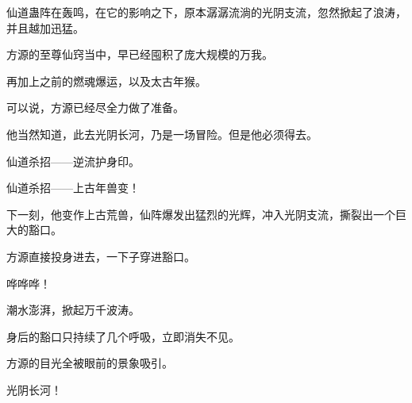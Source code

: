 \begin{this_body}
仙道蛊阵在轰鸣，在它的影响之下，原本潺潺流淌的光阴支流，忽然掀起了浪涛，并且越加迅猛。

方源的至尊仙窍当中，早已经囤积了庞大规模的万我。

再加上之前的燃魂爆运，以及太古年猴。

可以说，方源已经尽全力做了准备。

他当然知道，此去光阴长河，乃是一场冒险。但是他必须得去。

仙道杀招——逆流护身印。

仙道杀招——上古年兽变！

下一刻，他变作上古荒兽，仙阵爆发出猛烈的光辉，冲入光阴支流，撕裂出一个巨大的豁口。

方源直接投身进去，一下子穿进豁口。

哗哗哗！

潮水澎湃，掀起万千波涛。

身后的豁口只持续了几个呼吸，立即消失不见。

方源的目光全被眼前的景象吸引。

光阴长河！

\end{this_body}

